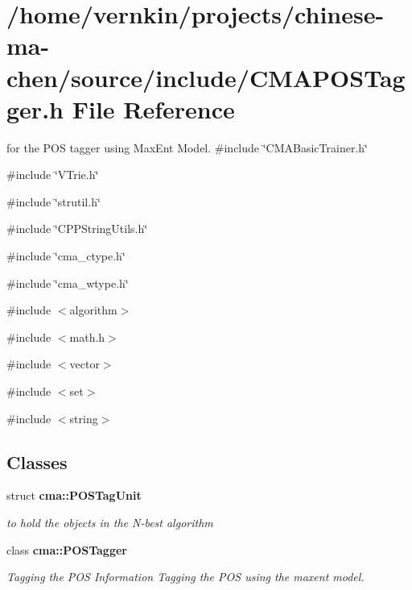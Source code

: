 \section{/home/vernkin/projects/chinese-\/ma-\/chen/source/include/CMAPOSTagger.h File Reference}
\label{CMAPOSTagger_8h}


for the POS tagger using MaxEnt Model.  
{\ttfamily \#include \char`\"{}CMABasicTrainer.h\char`\"{}}\par
{\ttfamily \#include \char`\"{}VTrie.h\char`\"{}}\par
{\ttfamily \#include \char`\"{}strutil.h\char`\"{}}\par
{\ttfamily \#include \char`\"{}CPPStringUtils.h\char`\"{}}\par
{\ttfamily \#include \char`\"{}cma\_\-ctype.h\char`\"{}}\par
{\ttfamily \#include \char`\"{}cma\_\-wtype.h\char`\"{}}\par
{\ttfamily \#include $<$algorithm$>$}\par
{\ttfamily \#include $<$math.h$>$}\par
{\ttfamily \#include $<$vector$>$}\par
{\ttfamily \#include $<$set$>$}\par
{\ttfamily \#include $<$string$>$}\par
\subsection*{Classes}
\begin{DoxyCompactItemize}
\item 
struct {\bf cma::POSTagUnit}
\begin{DoxyCompactList}\small\item\em to hold the objects in the N-\/best algorithm \item\end{DoxyCompactList}\item 
class {\bf cma::POSTagger}
\begin{DoxyCompactList}\small\item\em Tagging the POS Information Tagging the POS using the maxent model. \item\end{DoxyCompactList}\end{DoxyCompactItemize}
